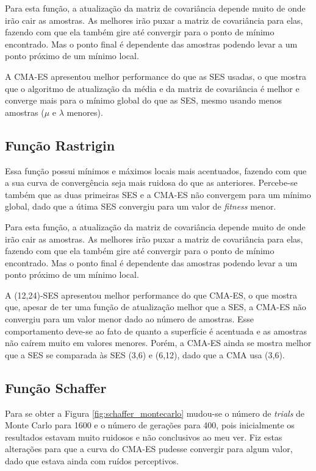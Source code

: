 \documentclass[brazil, 12pt]{article}
\begin{document}
Para esta função, a atualização da matriz de covariância depende muito de onde irão cair as amostras. As melhores irão puxar a matriz de covariância para elas, fazendo com que ela também gire até convergir para o ponto de mínimo encontrado. Mas o ponto final é dependente das amostras podendo levar a um ponto próximo de um mínimo local.

A CMA-ES apresentou melhor performance do que as SES usadas, o que mostra que o algoritmo de atualização da média e da matriz de covariância é melhor e converge mais para o mínimo global do que as SES, mesmo usando menos amostras ($\mu$ e $\lambda$ menores).

\subsection{Função Rastrigin}
Essa função possui mínimos e máximos locais mais acentuados, fazendo com que a sua curva de convergência seja mais ruidosa do que as anteriores. Percebe-se também que as duas primeiras SES e a CMA-ES não convergem para um mínimo global, dado que a útima SES convergiu para um valor de \textit{fitness} menor.

Para esta função, a atualização da matriz de covariância depende muito de onde irão cair as amostras. As melhores irão puxar a matriz de covariância para elas, fazendo com que ela também gire até convergir para o ponto de mínimo encontrado. Mas o ponto final é dependente das amostras podendo levar a um ponto próximo de um mínimo local.

A (12,24)-SES apresentou melhor performance do que CMA-ES, o que mostra que, apesar de ter uma função de atualização melhor que a SES, a CMA-ES não convergiu para um valor menor dado ao número de amostras. Esse comportamento deve-se ao fato de quanto a superfície é acentuada e as amostras não caírem muito em valores menores. Porém, a CMA-ES ainda se mostra melhor que a SES se comparada às SES (3,6) e (6,12), dado que a CMA usa (3,6).

\subsection{Função Schaffer}
Para se obter a Figura \ref{fig:schaffer_montecarlo} mudou-se o número de \textit{trials} de Monte Carlo para 1600 e o número de gerações para 400, pois inicialmente os resultados estavam muito ruidosos e não conclusivos ao meu ver. Fiz estas alterações para que a curva do CMA-ES pudesse convergir para algum valor, dado que estava ainda com ruídos perceptivos.
\end{document}
